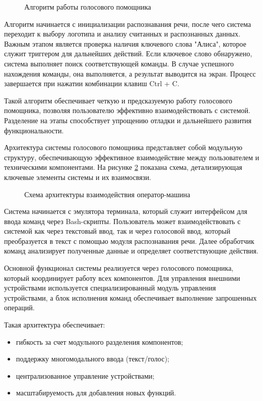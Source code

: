 \begin{figure}[H]
	\centering
	\caption{Алгоритм работы голосового помощника}
	\label{fig:algorithm}
\end{figure}

Алгоритм начинается с инициализации распознавания речи, после чего система переходит к выбору логотипа и анализу считанных и распознанных данных. Важным этапом является проверка наличия ключевого слова "Алиса", которое служит триггером для дальнейших действий. Если ключевое слово обнаружено, система выполняет поиск соответствующей команды. В случае успешного нахождения команды, она выполняется, а результат выводится на экран. Процесс завершается при нажатии комбинации клавиш Ctrl + C.

Такой алгоритм обеспечивает четкую и предсказуемую работу голосового помощника, позволяя пользователю эффективно взаимодействовать с системой. Разделение на этапы способствует упрощению отладки и дальнейшего развития функциональности.

Архитектура системы голосового помощника представляет собой модульную структуру, обеспечивающую эффективное взаимодействие между пользователем и техническими компонентами. На рисунке \ref{fig:system_architecture_diagram} показана схема, детализирующая ключевые элементы системы и их взаимосвязи.

\begin{figure}[H]
	\centering
	\caption{Схема архитектуры взаимодействия оператор-машина}
	\label{fig:system_architecture_diagram}
\end{figure}

Система начинается с эмулятора терминала, который служит интерфейсом для ввода команд через Bash-скрипты. Пользователь может взаимодействовать с системой как через текстовый ввод, так и через голосовой ввод, который преобразуется в текст с помощью модуля распознавания речи. Далее обработчик команд анализирует полученные данные и определяет соответствующие действия.

Основной функционал системы реализуется через голосового помощника, который координирует работу всех компонентов. Для управления внешними устройствами используется специализированный модуль управления устройствами, а блок исполнения команд обеспечивает выполнение запрошенных операций.

Такая архитектура обеспечивает:
\begin{itemize}
	\item гибкость за счет модульного разделения компонентов;
	\item поддержку многомодального ввода (текст/голос);
	\item централизованное управление устройствами;
	\item масштабируемость для добавления новых функций.
\end{itemize}

